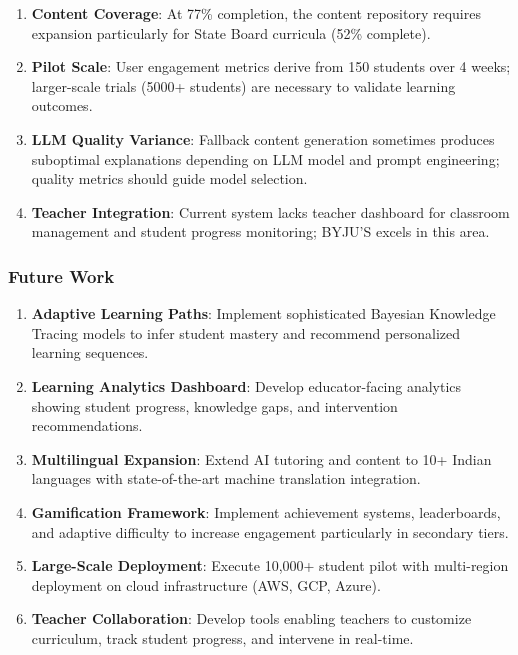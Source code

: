 \documentclass[10pt,conference,compsocconf]{IEEEtran}
\begin{document}
\begin{enumerate}
    \item \textbf{Content Coverage}: At 77\% completion, the content repository requires expansion particularly for State Board curricula (52\% complete).
    
    \item \textbf{Pilot Scale}: User engagement metrics derive from 150 students over 4 weeks; larger-scale trials (5000+ students) are necessary to validate learning outcomes.
    
    \item \textbf{LLM Quality Variance}: Fallback content generation sometimes produces suboptimal explanations depending on LLM model and prompt engineering; quality metrics should guide model selection.
    
    \item \textbf{Teacher Integration}: Current system lacks teacher dashboard for classroom management and student progress monitoring; BYJU'S excels in this area.
\end{enumerate}

\subsubsection{Future Work}

\begin{enumerate}
    \item \textbf{Adaptive Learning Paths}: Implement sophisticated Bayesian Knowledge Tracing models to infer student mastery and recommend personalized learning sequences.
    
    \item \textbf{Learning Analytics Dashboard}: Develop educator-facing analytics showing student progress, knowledge gaps, and intervention recommendations.
    
    \item \textbf{Multilingual Expansion}: Extend AI tutoring and content to 10+ Indian languages with state-of-the-art machine translation integration.
    
    \item \textbf{Gamification Framework}: Implement achievement systems, leaderboards, and adaptive difficulty to increase engagement particularly in secondary tiers.
    
    \item \textbf{Large-Scale Deployment}: Execute 10,000+ student pilot with multi-region deployment on cloud infrastructure (AWS, GCP, Azure).
    
    \item \textbf{Teacher Collaboration}: Develop tools enabling teachers to customize curriculum, track student progress, and intervene in real-time.
\end{enumerate}
\end{document}
